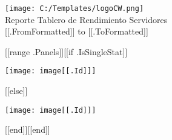\documentclass{article}
\begin{document}
    \begin{center}
    \texttt{[image: C:/Templates/logoCW.png]}\\[1.0 cm] %
        \Huge{Reporte Tablero de Rendimiento Servidores}\\
         \vspace{8mm}
            \Large{[[.FromFormatted]] to [[.ToFormatted]]}
         \vspace{8mm}
\end{center}
\newpage
\begin{center}
[[range .Panels]][[if .IsSingleStat]]\begin{minipage}{0.3\textwidth}
\texttt{[image: image[[.Id]]]}
\end{minipage}
[[else]]\par
\vspace{0.5cm}
\texttt{[image: image[[.Id]]]}
\par
\vspace{0.5cm}
[[end]][[end]]
\end{center}
\end{document}
